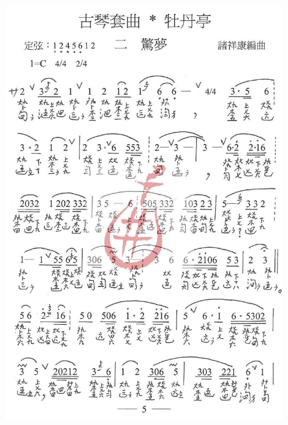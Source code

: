 \documentclass[cn,pad,twocol]{elegantbook}
\begin{document}
\paragraph*{\includegraphics[width=0.9\textwidth]{mudanting/2021-牡丹亭-05惊梦}} 
\end{document}
